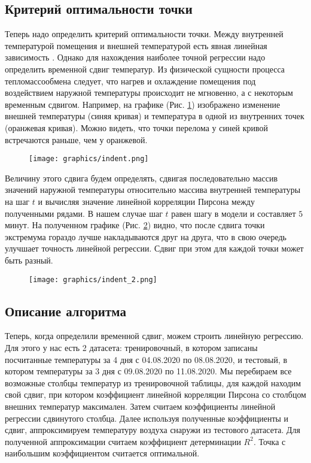 \newpage


\subsection{Критерий оптимальности точки}
\label{algo-2}

Теперь надо определить критерий оптимальности точки. Между внутренней температурой помещения и внешней температурой есть явная линейная зависимость \cite{indent}. Однако для нахождения наиболее точной регрессии надо определить временной сдвиг температур. Из физической сущности процесса тепломассообмена следует, что нагрев и охлаждение помещения под воздействием наружной температуры происходит не мгновенно, а с некоторым временным сдвигом. Например, на графике (Рис. \ref{indent1}) изображено изменение внешней температуры (синяя кривая) и температура в одной из внутренних точек (оранжевая кривая). Можно видеть, что точки перелома у синей кривой встречаются раньше, чем у оранжевой.

\begin{figure}[H]
\texttt{[image: graphics/indent.png]}
\caption{}
\label{indent1}
\end{figure}

\newpage

Величину этого сдвига будем определять, сдвигая последовательно массив значений наружной температуры относительно массива внутренней температуры на шаг $t$ и вычисляя значение линейной корреляции Пирсона между полученными рядами. В нашем случае шаг $t$ равен шагу в модели и составляет $5$ минут. На полученном графике (Рис. \ref{indent2}) видно, что после сдвига точки экстремума гораздо лучше накладываются друг на друга, что в свою очередь улучшает точность линейной регрессии. Сдвиг при этом для каждой точки может быть разный.

\begin{figure}[H]
\texttt{[image: graphics/indent\_2.png]}
\caption{}
\label{indent2}
\end{figure}

\newpage 


\subsection{Описание алгоритма}

Теперь, когда определили временной сдвиг, можем строить линейную регрессию. Для этого у нас есть 2 датасета: тренировочный, в котором записаны посчитанные температуры за 4 дня с 04.08.2020 по 08.08.2020, и тестовый, в котором температуры за 3 дня с 09.08.2020 по 11.08.2020. Мы перебираем все возможные столбцы температур из тренировочной таблицы, для каждой находим свой сдвиг, при котором коэффициент линейной корреляции Пирсона со столбцом внешних температур максимален. Затем считаем коэффициенты линейной регрессии сдвинутого столбца. Далее используя полученные коэффициенты и сдвиг, аппроксимируем температуру воздуха снаружи из тестового датасета. Для полученной аппроксимации считаем коэффициент детерминации $R^2$. Точка с наибольшим коэффициентом считается оптимальной.

